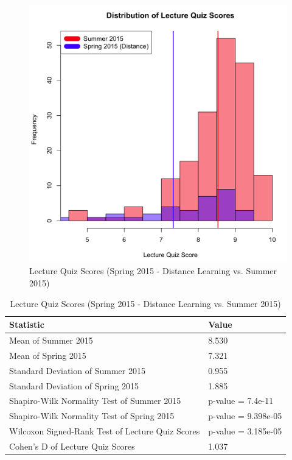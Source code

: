 \begin{figure}
	\centering
	\includegraphics[width=5in]{img/chapter4/lq_su15_vs_sp15d}
	\caption[Lecture Quiz Scores (Spring 2015 - Distance Learning vs. Summer 2015)]{Lecture Quiz Scores (Spring 2015 - Distance Learning vs. Summer 2015)}
  \label{fig:rqSp15dSu15}
\end{figure}

\begin{small}
\begin{table}
  \centering
  \begin{tabular}{|l|l|}
    \hline
    \textbf{Statistic} & \textbf{Value} \\
	\hline
	Mean of Summer 2015 & 8.530 \\
	\hline
	Mean of Spring 2015 & 7.321 \\
	\hline
	Standard Deviation of Summer 2015 & 0.955 \\
	\hline
	Standard Deviation of Spring 2015 & 1.885 \\
	\hline
	Shapiro-Wilk Normality Test of Summer 2015 & p-value = 7.4e-11 \\
	\hline
	Shapiro-Wilk Normality Test of Spring 2015 & p-value = 9.398e-05 \\
	\hline
	Wilcoxon Signed-Rank Test of Lecture Quiz Scores & p-value = 3.185e-05 \\
	\hline
	Cohen's D of Lecture Quiz Scores & 1.037 \\
	\hline
  \end{tabular}
	\caption[Lecture Quiz Scores (Spring 2015 - Distance Learning vs. Summer 2015)]{Lecture Quiz Scores (Spring 2015 - Distance Learning vs. Summer 2015)}
  \label{tab:rqSp15dSu15}
\end{table}
\end{small}


